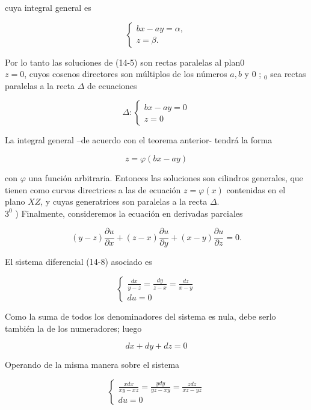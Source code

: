 \documentclass[10pt]{article}
\theoremstyle{plain}
\theoremstyle{definition}
\theoremstyle{remark}
\begin{document}
cuya integral general es

$$
\left\{\begin{array}{l}
b x-a y=\alpha, \\
z=\beta .
\end{array}\right.
$$

Por lo tanto las soluciones de (14-5) son rectas paralelas al plan0\\
$z=0$, cuyos cosenos directores son múltiplos de los números $a, b$ y 0 ; ${ }_{0}$ sea rectas paralelas a la recta $\Delta$ de ecuaciones

$$
\Delta:\left\{\begin{array}{l}
b x-a y=0 \\
z=0
\end{array}\right.
$$

La integral general --de acuerdo con el teorema anterior- tendrá la forma

$$
z=\varphi(b x-a y)
$$

con $\varphi$ una función arbitraria. Entonces las soluciones son cilindros generales, que tienen como curvas directrices a las de ecuación $z=\varphi(x)$ contenidas en el plano $X Z$, y cuyas generatrices son paralelas a la recta $\Delta$.\\
$3^{0}$ ) Finalmente, consideremos la ecuación en derivadas parciales


\begin{equation*}
(y-z) \frac{\partial u}{\partial x}+(z-x) \frac{\partial u}{\partial y}+(x-y) \frac{\partial u}{\partial z}=0 . \tag{14-11}
\end{equation*}


El sistema diferencial (14-8) asociado es

\[
\left\{\begin{array}{l}
\frac{d x}{y-z}=\frac{d y}{z-x}=\frac{d z}{x-y}  \tag{14-12}\\
d u=0
\end{array}\right.
\]

Como la suma de todos los denominadores del sistema es nula, debe serlo también la de los numeradores; luego

$$
d x+d y+d z=0
$$

Operando de la misma manera sobre el sistema


$$
\left\{\begin{array}{l}
\frac{x d x}{x y-x z}=\frac{y d y}{y z-x y}=\frac{z d z}{x z-y z} \\
d u=0
\end{array}\right.
$$
\end{document}
